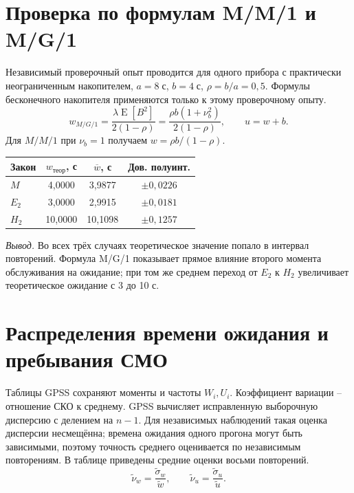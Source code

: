\documentclass[12pt,a4paper]{article}
\newcommand{\concl}[1]{\par\noindent\textit{Вывод.} #1\par}
\begin{document}
\section{Проверка по формулам M/M/1 и M/G/1}
Независимый проверочный опыт проводится для одного прибора с практически неограниченным накопителем, \(a=8\;\text{с}\), \(b=4\;\text{с}\), \(\rho=b/a=0{,}5\). Формулы бесконечного накопителя применяются только к этому проверочному опыту.
\begin{equation}
w_{M/G/1}=\frac{\lambda\operatorname{E}[B^2]}{2(1-\rho)}
=\frac{\rho b(1+\nu_b^2)}{2(1-\rho)},\qquad u=w+b.
\end{equation}
Для \(M/M/1\) при \(\nu_b=1\) получаем \(w=\rho b/(1-\rho)\).

\begin{center}\small\renewcommand{\arraystretch}{1.3}
\begin{tabular}{|l|c|c|c|}\hline
Закон & \(w_{\text{теор}}\), с & \(\overline w\), с & Дов. полуинт.\\\hline
\(M\) & 4,0000 & 3,9877 & \(\pm 0,0226\)\\\hline
\(E_2\) & 3,0000 & 2,9915 & \(\pm 0,0181\)\\\hline
\(H_2\) & 10,0000 & 10,1098 & \(\pm 0,1257\)\\\hline
\end{tabular}\end{center}


\concl{Во всех трёх случаях теоретическое значение попало в интервал повторений. Формула M/G/1 показывает прямое влияние второго момента обслуживания на ожидание; при том же среднем переход от \(E_2\) к \(H_2\) увеличивает теоретическое ожидание с 3 до 10 с.}

\section{Распределения времени ожидания и пребывания СМО}
Таблицы GPSS сохраняют моменты и частоты \(W_i,U_i\). Коэффициент вариации -- отношение СКО к среднему. GPSS вычисляет исправленную выборочную дисперсию с делением на \(n-1\). Для независимых наблюдений такая оценка дисперсии несмещённа; времена ожидания одного прогона могут быть зависимыми, поэтому точность среднего оценивается по независимым повторениям. В таблице приведены средние оценки восьми повторений.
\begin{equation}
\widetilde\nu_w=\frac{\widetilde\sigma_w}{\widetilde w},\qquad
\widetilde\nu_u=\frac{\widetilde\sigma_u}{\widetilde u}.
\end{equation}
\end{document}
